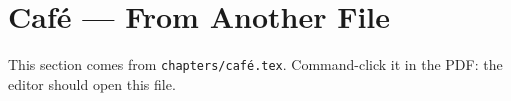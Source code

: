
\section{Café — From Another File}
This section comes from \texttt{chapters/café.tex}. Command-click it in the
PDF: the editor should open this file.
